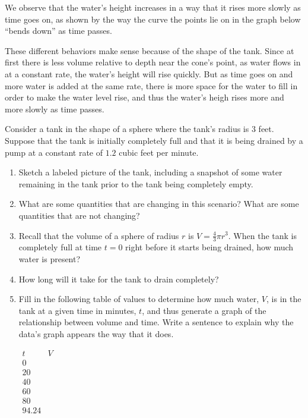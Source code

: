 \documentclass{ximera}
\begin{document}
We observe that the water's height increases in a way that it rises more slowly as time goes on, as shown by the way the curve the points lie on in the graph below ``bends down'' as time passes. 

These different behaviors make sense because of the shape of the tank.  Since at first there is less volume relative to depth near the cone's point, as water flows in at a constant rate, the water's height will rise quickly.  But as time goes on and more water is added at the same rate, there is more space for the water to fill in order to make the water level rise, and thus the water's heigh rises more and more slowly as time passes.%


\begin{exploration}

Consider a tank in the shape of a sphere where the tank's radius is \(3\) feet.  Suppose that the tank is initially completely full and that it is being drained by a pump at a constant rate of \(1.2\) cubic feet per minute.%

\begin{enumerate}[label=\alph*.]
\item Sketch a labeled picture of the tank, including a snapshot of some water remaining in the tank prior to the tank being completely empty.%
\item What are some quantities that are changing in this scenario?  What are some quantities that are not changing?%
\item Recall that the volume of a sphere of radius \(r\) is \(V = \frac{4}{3} \pi r^3\).  When the tank is completely full at time \(t = 0\) right before it starts being drained, how much water is present?%
\item How long will it take for the tank to drain completely?%
\item Fill in the following table of values to determine how much water, \(V\), is in the tank at a given time in minutes, \(t\), and thus generate a graph of the relationship between volume and time.  Write a sentence to explain why the data's graph appears the way that it does.%

\begin{center}
\(
\begin{array}{cc}
t&V\\
\hline
0&\\
20&\\
40&\\
60&\\
80&\\
94.24&
\end{array}
\)
\end{center}


\end{enumerate}
\end{exploration}
\end{document}
